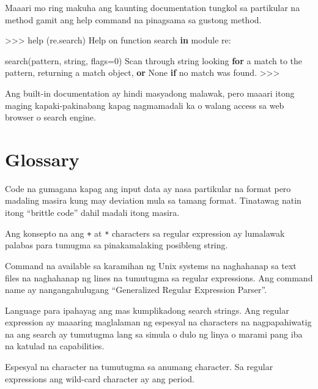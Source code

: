 \documentclass[10pt,]{book}
\newenvironment{Shaded}{}{}
\newcommand{\BuiltInTok}[1]{\textcolor[rgb]{0.00,0.50,0.00}{#1}}
\newcommand{\ControlFlowTok}[1]{\textcolor[rgb]{0.00,0.44,0.13}{\textbf{#1}}}
\newcommand{\DecValTok}[1]{\textcolor[rgb]{0.25,0.63,0.44}{#1}}
\newcommand{\KeywordTok}[1]{\textcolor[rgb]{0.00,0.44,0.13}{\textbf{#1}}}
\newcommand{\NormalTok}[1]{#1}
\newcommand{\OperatorTok}[1]{\textcolor[rgb]{0.40,0.40,0.40}{#1}}
\newcommand{\VariableTok}[1]{\textcolor[rgb]{0.10,0.09,0.49}{#1}}
\providecommand{\tightlist}{%
  \setlength{\itemsep}{0pt}\setlength{\parskip}{0pt}}
\begin{document}
Maaari mo ring makuha ang kaunting documentation tungkol sa partikular
na method gamit ang help command na pinagsama sa gustong method.

\begin{Shaded}
\begin{Highlighting}[]
\OperatorTok{\textgreater{}\textgreater{}\textgreater{}} \BuiltInTok{help}\NormalTok{ (re.search)}
\NormalTok{Help on function search }\KeywordTok{in}\NormalTok{ module re:}

\NormalTok{search(pattern, string, flags}\OperatorTok{=}\DecValTok{0}\NormalTok{)}
\NormalTok{    Scan through string looking }\ControlFlowTok{for}\NormalTok{ a match to the pattern, returning}
\NormalTok{    a match }\BuiltInTok{object}\NormalTok{, }\KeywordTok{or} \VariableTok{None} \ControlFlowTok{if}\NormalTok{ no match was found.}
\OperatorTok{\textgreater{}\textgreater{}\textgreater{}}
\end{Highlighting}
\end{Shaded}

Ang built-in documentation ay hindi masyadong malawak, pero maaari itong
maging kapaki-pakinabang kapag nagmamadali ka o walang access sa web
browser o search engine.

\section{Glossary}\label{glossary-10}

\begin{description}
\tightlist
\item[brittle code]
Code na gumagana kapag ang input data ay nasa partikular na format pero
madaling masira kung may deviation mula sa tamang format. Tinatawag
natin itong ``brittle code'' dahil madali itong masira.
\item[greedy matching]
Ang konsepto na ang \texttt{+} at \texttt{*} characters sa regular
expression ay lumalawak palabas para tumugma sa pinakamalaking posibleng
string.  
\item[grep]
Command na available sa karamihan ng Unix systems na naghahanap sa text
files na naghahanap ng lines na tumutugma sa regular expressions. Ang
command name ay nangangahulugang ``Generalized Regular Expression
Parser''. 
\item[regular expression]
Language para ipahayag ang mas kumplikadong search strings. Ang regular
expression ay maaaring maglalaman ng espesyal na characters na
nagpapahiwatig na ang search ay tumutugma lang sa simula o dulo ng linya
o marami pang iba na katulad na capabilities.
\item[wild card]
Espesyal na character na tumutugma sa anumang character. Sa regular
expressions ang wild-card character ay ang period. 
\end{description}
\end{document}
